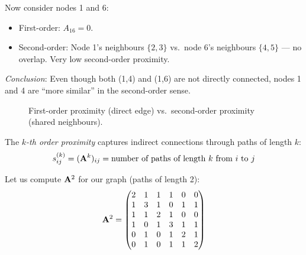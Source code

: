\begin{notechapter}
\begin{example}
Now consider nodes 1 and 6:
\begin{itemize}
    \item First-order: $A_{16} = 0$.
    \item Second-order: Node 1's neighbours $\{2,3\}$ vs.\ node 6's neighbours $\{4,5\}$ --- no overlap. Very low second-order proximity.
\end{itemize}

\emph{Conclusion}: Even though both (1,4) and (1,6) are not directly connected, nodes 1 and 4 are ``more similar'' in the second-order sense.
\end{example}

\begin{figure}[htbp]
\centering
{}
\caption{First-order proximity (direct edge) vs.\ second-order proximity (shared neighbours).}
\label{shallow-embeddings:fig:proximity_types}
\end{figure}

\begin{definition}
The \emph{$k$-th order proximity} captures indirect connections through paths of length $k$:
\[
s^{(k)}_{ij} = (\mathbf{A}^k)_{ij} = \text{number of paths of length } k \text{ from } i \text{ to } j
\]
\end{definition}

\begin{example}
Let us compute $\mathbf{A}^2$ for our graph (paths of length 2):
\[
\mathbf{A}^2 = \begin{pmatrix}
2 & 1 & 1 & 1 & 0 & 0 \\
1 & 3 & 1 & 0 & 1 & 1 \\
1 & 1 & 2 & 1 & 0 & 0 \\
1 & 0 & 1 & 3 & 1 & 1 \\
0 & 1 & 0 & 1 & 2 & 1 \\
0 & 1 & 0 & 1 & 1 & 2
\end{pmatrix}
\]


\end{example}
\end{notechapter}
